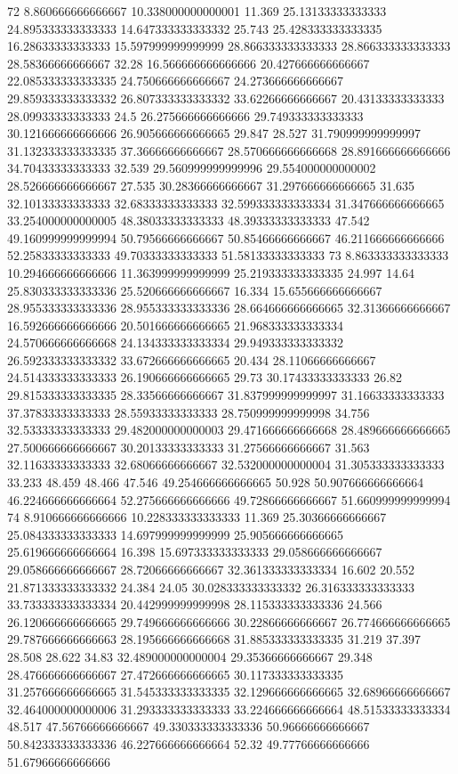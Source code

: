 72 8.860666666666667 10.338000000000001 11.369 25.13133333333333 24.895333333333333 14.647333333333332 25.743 25.428333333333335 16.28633333333333 15.597999999999999 28.866333333333333 28.866333333333333 28.58366666666667 32.28 16.566666666666666 20.427666666666667 22.085333333333335 24.750666666666667 24.273666666666667 29.859333333333332 26.807333333333332 33.62266666666667 20.43133333333333 28.09933333333333 24.5 26.275666666666666 29.749333333333333 30.121666666666666 26.905666666666665 29.847 28.527 31.790999999999997 31.132333333333335 37.36666666666667 28.570666666666668 28.891666666666666 34.70433333333333 32.539 29.560999999999996 29.554000000000002 28.526666666666667 27.535 30.28366666666667 31.297666666666665 31.635 32.10133333333333 32.68333333333333 32.599333333333334 31.347666666666665 33.254000000000005 48.38033333333333 48.39333333333333 47.542 49.160999999999994 50.79566666666667 50.85466666666667 46.211666666666666 52.25833333333333 49.70333333333333 51.58133333333333
73 8.863333333333333 10.294666666666666 11.363999999999999 25.219333333333335 24.997 14.64 25.830333333333336 25.520666666666667 16.334 15.655666666666667 28.955333333333336 28.955333333333336 28.664666666666665 32.31366666666667 16.592666666666666 20.501666666666665 21.968333333333334 24.570666666666668 24.134333333333334 29.949333333333332 26.592333333333332 33.672666666666665 20.434 28.11066666666667 24.514333333333333 26.190666666666665 29.73 30.17433333333333 26.82 29.815333333333335 28.33566666666667 31.837999999999997 31.16633333333333 37.37833333333333 28.55933333333333 28.750999999999998 34.756 32.53333333333333 29.482000000000003 29.471666666666668 28.489666666666665 27.500666666666667 30.20133333333333 31.27566666666667 31.563 32.11633333333333 32.68066666666667 32.532000000000004 31.305333333333333 33.233 48.459 48.466 47.546 49.254666666666665 50.928 50.907666666666664 46.224666666666664 52.275666666666666 49.72866666666667 51.660999999999994
74 8.910666666666666 10.228333333333333 11.369 25.30366666666667 25.084333333333333 14.697999999999999 25.905666666666665 25.619666666666664 16.398 15.697333333333333 29.058666666666667 29.058666666666667 28.72066666666667 32.361333333333334 16.602 20.552 21.871333333333332 24.384 24.05 30.028333333333332 26.316333333333333 33.733333333333334 20.442999999999998 28.115333333333336 24.566 26.120666666666665 29.749666666666666 30.22866666666667 26.774666666666665 29.787666666666663 28.195666666666668 31.885333333333335 31.219 37.397 28.508 28.622 34.83 32.489000000000004 29.35366666666667 29.348 28.476666666666667 27.472666666666665 30.117333333333335 31.257666666666665 31.545333333333335 32.129666666666665 32.68966666666667 32.464000000000006 31.293333333333333 33.224666666666664 48.51533333333334 48.517 47.56766666666667 49.330333333333336 50.96666666666667 50.842333333333336 46.227666666666664 52.32 49.77766666666666 51.67966666666666
